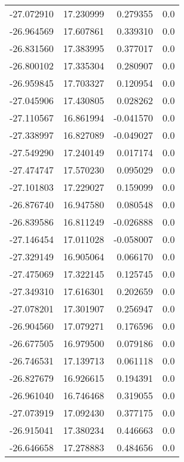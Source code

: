 \begin{tabular}{rrrr}
      -27.072910 &        17.230999 &    0.279355 &   0.0 \\
      -26.964569 &        17.607861 &    0.339310 &   0.0 \\
      -26.831560 &        17.383995 &    0.377017 &   0.0 \\
      -26.800102 &        17.335304 &    0.280907 &   0.0 \\
      -26.959845 &        17.703327 &    0.120954 &   0.0 \\
      -27.045906 &        17.430805 &    0.028262 &   0.0 \\
      -27.110567 &        16.861994 &   -0.041570 &   0.0 \\
      -27.338997 &        16.827089 &   -0.049027 &   0.0 \\
      -27.549290 &        17.240149 &    0.017174 &   0.0 \\
      -27.474747 &        17.570230 &    0.095029 &   0.0 \\
      -27.101803 &        17.229027 &    0.159099 &   0.0 \\
      -26.876740 &        16.947580 &    0.080548 &   0.0 \\
      -26.839586 &        16.811249 &   -0.026888 &   0.0 \\
      -27.146454 &        17.011028 &   -0.058007 &   0.0 \\
      -27.329149 &        16.905064 &    0.066170 &   0.0 \\
      -27.475069 &        17.322145 &    0.125745 &   0.0 \\
      -27.349310 &        17.616301 &    0.202659 &   0.0 \\
      -27.078201 &        17.301907 &    0.256947 &   0.0 \\
      -26.904560 &        17.079271 &    0.176596 &   0.0 \\
      -26.677505 &        16.979500 &    0.079186 &   0.0 \\
      -26.746531 &        17.139713 &    0.061118 &   0.0 \\
      -26.827679 &        16.926615 &    0.194391 &   0.0 \\
      -26.961040 &        16.746468 &    0.319055 &   0.0 \\
      -27.073919 &        17.092430 &    0.377175 &   0.0 \\
      -26.915041 &        17.380234 &    0.446663 &   0.0 \\
      -26.646658 &        17.278883 &    0.484656 &   0.0 \\

\end{tabular}
